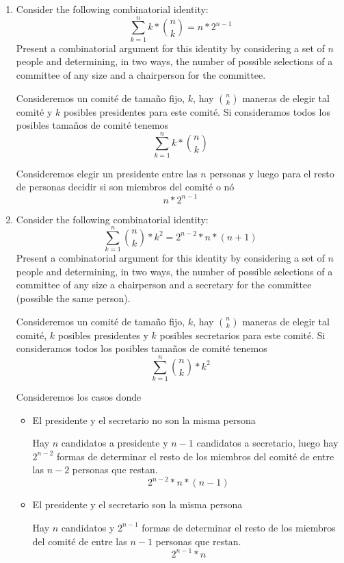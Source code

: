\item 
\begin{enumerate}
    \item Consider the following combinatorial identity:
    \[ \sum_{k=1}^n k * \binom{n}{k} = n * 2^{n-1} \]
    Present a combinatorial argument for this identity by considering a set of $n$ people and determining, in two ways, the number of possible selections of a committee of any size and a chairperson for the committee.

    Consideremos un comité de tamaño fijo, $k$, hay $\displaystyle \binom{n}{k}$ maneras de elegir tal comité y $k$ posibles presidentes para este comité. Si consideramos todos los posibles tamaños de comité tenemos
    \[ \sum_{k=1}^n k * \binom{n}{k} \]

    Consideremos elegir un presidente entre las $n$ personas y luego para el resto de personas decidir si son miembros del comité o nó
    \[ n * 2^{n-1} \]

    \item Consider the following combinatorial identity:
    \[ \sum_{k=1}^n \binom{n}{k} * k^2 = 2^{n-2} * n * (n+1) \]
    Present a combinatorial argument for this identity by considering a set of $n$ people and determining, in two ways, the number of possible selections of a committee of any size a chairperson and a secretary for the committee (possible the same person).

    Consideremos un comité de tamaño fijo, $k$, hay $\displaystyle \binom{n}{k}$ maneras de elegir tal comité, $k$ posibles presidentes y $k$ posibles secretarios para este comité. Si consideramos todos los posibles tamaños de comité tenemos
    \[ \sum_{k=1}^n \binom{n}{k} * k^2 \]

    Consideremos los casos donde
    \begin{itemize}
        \item[] El presidente y el secretario no son la misma persona
        
        Hay $n$ candidatos a presidente y $n-1$ candidatos a secretario, luego hay $2^{n-2}$ formas de determinar el resto de los miembros del comité de entre las $n-2$ personas que restan.
        \[ 2^{n-2} * n * (n-1) \]
        
        \item[] El presidente y el secretario son la misma persona
        
        Hay $n$ candidatos y $2^{n-1}$ formas de determinar el resto de los miembros del comité de entre las $n-1$ personas que restan.
        \[ 2^{n-1} * n \]
    \end{itemize}


\end{enumerate}
